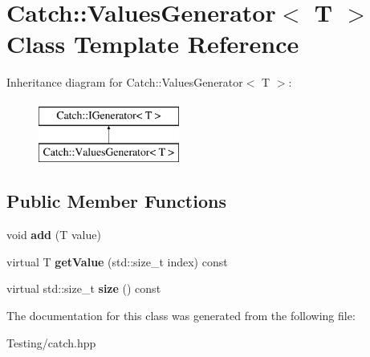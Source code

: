 \hypertarget{class_catch_1_1_values_generator}{\section{Catch\-:\-:Values\-Generator$<$ T $>$ Class Template Reference}
\label{class_catch_1_1_values_generator}
}
Inheritance diagram for Catch\-:\-:Values\-Generator$<$ T $>$\-:\begin{figure}[H]
\begin{center}
\leavevmode
\includegraphics[height=2.000000cm]{class_catch_1_1_values_generator}
\end{center}
\end{figure}
\subsection*{Public Member Functions}
\begin{DoxyCompactItemize}
\item 
\hypertarget{class_catch_1_1_values_generator_a8412c8ce5d9d4fc6ff06d5246d56d538}{void {\bfseries add} (T value)}\label{class_catch_1_1_values_generator_a8412c8ce5d9d4fc6ff06d5246d56d538}

\item 
\hypertarget{class_catch_1_1_values_generator_a60599dd67096ff108471f64ee42acd9d}{virtual T {\bfseries get\-Value} (std\-::size\-\_\-t index) const }\label{class_catch_1_1_values_generator_a60599dd67096ff108471f64ee42acd9d}

\item 
\hypertarget{class_catch_1_1_values_generator_a98a80bb0dd682c44e82e4a75e98c4682}{virtual std\-::size\-\_\-t {\bfseries size} () const }\label{class_catch_1_1_values_generator_a98a80bb0dd682c44e82e4a75e98c4682}

\end{DoxyCompactItemize}


The documentation for this class was generated from the following file\-:\begin{DoxyCompactItemize}
\item 
Testing/catch.\-hpp\end{DoxyCompactItemize}
